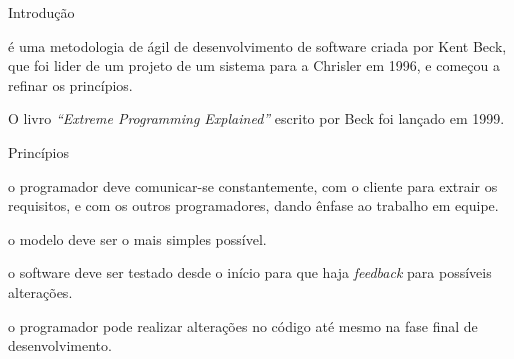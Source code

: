 \lecturetitle{\insertlecture}{\course}
\frame{\maketitle}

\begin{frame}{\insertlecture}{Introdução}

  \alert{\insertlecture{}} é uma metodologia de ágil de
  desenvolvimento de software criada por Kent Beck, que foi lider de
  um projeto de um sistema para a Chrisler em 1996, e começou a
  refinar os princípios.
  
  \pause
  
  \bigskip
  O livro {\em ``Extreme Programming Explained''} escrito por Beck foi 
  lançado em 1999.
\end{frame}

\begin{frame}{Princípios}{\insertlecture}
  
  \begin{description}[<+-| alert@+>]
  \item[Comunicação:] o programador deve comunicar-se constantemente,
    com o cliente para extrair os requisitos, e com os outros
    programadores, dando ênfase ao trabalho em equipe.
  \item[Simplicidade:] o modelo deve ser o mais simples possível.
  \item[{\em Feedback:}] o software deve ser testado desde o início para 
    que haja {\em feedback} para possíveis alterações.
  \item[Coragem:] o programador pode realizar alterações no código até 
    mesmo na fase final de desenvolvimento.
  \end{description}

\end{frame}


